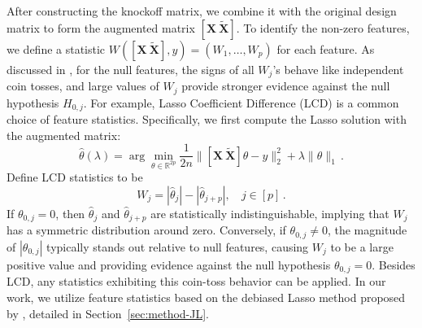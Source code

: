 \documentclass[11pt]{article}
\newcommand{\bX}{\boldsymbol{X}}
\newcommand{\bXT}{\widetilde{\bX} }
\newcommand{\mbR}{\mathbb{R}}
\newcommand{\hth}{\widehat{\theta}}
\begin{document}
After constructing the knockoff matrix, we combine it with the original design matrix to form the augmented matrix $[\bX\ \bXT]$. To identify the non-zero features, we define a statistic $W([\bX\ \bXT],y)=(W_1,\dotsc,W_p)$ for each feature. As discussed in \cite{candes2017panning}, for the null features, the signs of all $W_j$'s behave like independent coin tosses, and large values of $W_j$ provide stronger evidence against the null hypothesis $H_{0,j}$. For example, Lasso Coefficient Difference (LCD) is a common choice of feature statistics. Specifically, we first compute the Lasso solution with the augmented matrix:
\begin{equation}\label{eq:lasso-knockoff}
    \hth(\lambda) = \arg\min_{\theta\in\mbR^{2p}}\frac{1}{2n}\|[\bX\ \bXT]\theta-y\|_2^2+\lambda\|\theta\|_1\,.
\end{equation}
Define LCD statistics to be
\[
W_j = |\hth_j|-|\hth_{j+p}|, \phantom{ss} j\in[p]\,.
\]
If $\theta_{0,j}=0$, then $\hth_j$ and $\hth_{j+p}$ are statistically indistinguishable, implying that $W_j$ has a symmetric distribution around zero. Conversely, if $\theta_{0,j}\neq 0$, the magnitude of $|\theta_{0,j}|$ typically stands out relative to null features, causing $W_j$ to be a large positive value and providing evidence against the null hypothesis $\theta_{0,j}=0$. Besides LCD, any statistics exhibiting this coin-toss behavior can be applied. In our work, we utilize feature statistics based on the debiased Lasso method proposed by \cite{JM14}, detailed in Section~\ref{sec:method-JL}.
\end{document}
